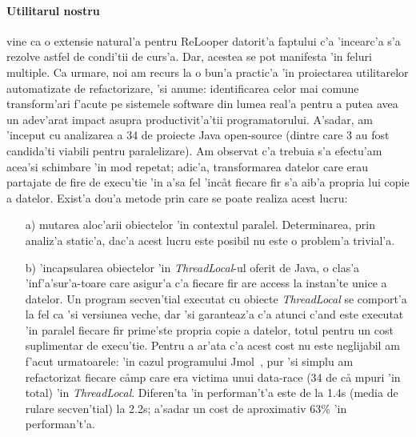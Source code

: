 \paragraph{Utilitarul nostru} vine ca o extensie natural'a pentru ReLooper
datorit'a faptului c'a 'incearc'a s'a rezolve astfel de condi'tii de curs'a.
Dar, acestea se pot manifesta 'in feluri multiple. Ca urmare, noi am recurs la o
bun'a practic'a 'in proiectarea utilitarelor automatizate de refactorizare, 'si
anume: identificarea celor mai comune transform'ari f'acute pe sistemele
software din lumea real'a pentru a putea avea un adev'arat impact asupra
productivit'a'tii programatorului. A'sadar, am 'inceput cu analizarea a 34 de
proiecte Java open-source (dintre care 3 au fost candida'ti viabili pentru
paralelizare). Am observat c'a trebuia s'a efectu'am acea'si schimbare 'in mod
repetat; adic'a, transformarea datelor care erau partajate de fire de execu'tie
'in a'sa fel 'inc\aa t fiecare fir s'a aib'a propria lui copie a datelor.
Exist'a dou'a metode prin care se poate realiza acest lucru:
\begin{enumerate}
  \item [a)] mutarea aloc'arii obiectelor 'in contextul paralel. Determinarea,
  prin analiz'a static'a, dac'a acest lucru este posibil nu este o problem'a
  trivial'a.
  \item [b)] 'incapsularea obiectelor 'in \emph{ThreadLocal}-ul oferit de Java,
  o clas'a 'inf'a'sur'a-toare care asigur'a c'a fiecare fir are access la
  instan'te unice a datelor.  Un program secven'tial executat cu obiecte
  \emph{ThreadLocal} se comport'a la fel ca 'si versiunea veche, dar 'si
  garanteaz'a c'a atunci c'and este executat 'in paralel fiecare fir
  prime'ste propria copie a datelor, totul pentru un cost suplimentar de
  execu'tie. Pentru a ar'ata c'a acest cost nu este neglijabil am f'acut
  urmatoarele: 'in cazul programului Jmol~\cite{Jmol-site}, pur 'si simplu
  am refactorizat fiecare c\aa mp care era victima unui data-race (34 de c\aa
  mpuri 'in total) 'in \emph{ThreadLocal}. Diferen'ta 'in performan't'a este
  de la 1.4s (media de rulare secven'tial) la 2.2s; a'sadar un cost de
  aproximativ 63\% 'in performan't'a.
\end{enumerate}

